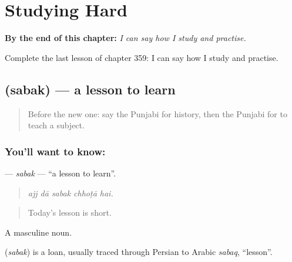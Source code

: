 
\chapter{Studying Hard}
\label{ch:pa-a2-studying-hard}

\begin{chapteropening}
\textbf{By the end of this chapter:} \emph{I can say how I study and practise.}

Complete the last lesson of chapter 359: I can say how I study and practise.
\end{chapteropening}

\section[\texorpdfstring{\pa{ਸਬਕ} (sabak)}{ਸਬਕ (sabak)}]{ (sabak) — a lesson to learn}

\label{lesson:PA-C359-sabak}



\begin{quote}
Before the new one: say the Punjabi for history, then the Punjabi for to teach a subject.
\end{quote}

\subsection*{You'll want to know: }
\textbf{} — \emph{sabak} — \textquotedblleft{}a lesson to learn\textquotedblright{}.

\begin{quote}
    
\end{quote}

\begin{quote}
\emph{ajj dā sabak chhoṭā hai.}
\end{quote}

\begin{quote}
Today's lesson is short.
\end{quote}

A masculine noun.

\begin{cousinweb}
\textbf{} (\emph{sabak}) is a loan, usually traced through Persian to Arabic \emph{sabaq}, \textquotedblleft{}lesson\textquotedblright{}.
\end{cousinweb}

